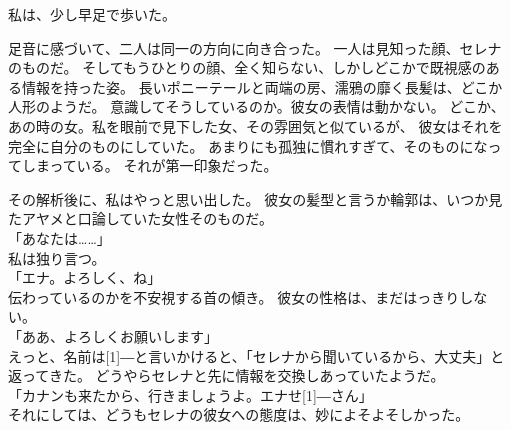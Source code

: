 \documentclass[../IHMain]{subfiles}
\begin{document}
私は、少し早足で歩いた。

足音に感づいて、二人は同一の方向に向き合った。
一人は見知った顔、セレナのものだ。
そしてもうひとりの顔、全く知らない、しかしどこかで既視感のある情報を持った姿。
長いポニーテールと両端の房、濡鴉の靡く長髪は、どこか人形のようだ。
意識してそうしているのか。彼女の表情は動かない。
どこか、あの時の女。私を眼前で見下した女、その雰囲気と似ているが、
彼女はそれを完全に自分のものにしていた。
あまりにも孤独に慣れすぎて、そのものになってしまっている。
それが第一印象だった。

その解析後に、私はやっと思い出した。
彼女の髪型と言うか輪郭は、いつか見たアヤメと口論していた女性そのものだ。\\
「あなたは……」\\
私は独り言つ。\\
「エナ。よろしく、ね」\\
伝わっているのかを不安視する首の傾き。
彼女の性格は、まだはっきりしない。\\
「ああ、よろしくお願いします」\\
えっと、名前は\scalebox{3}[1]{―}と言いかけると、「セレナから聞いているから、大丈夫」と返ってきた。
どうやらセレナと先に情報を交換しあっていたようだ。\\
「カナンも来たから、行きましょうよ。エナせ\scalebox{3}[1]{―}さん」\\
それにしては、どうもセレナの彼女への態度は、妙によそよそしかった。
\end{document}
